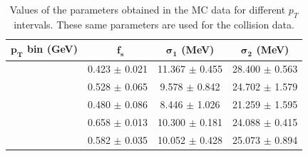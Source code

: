 \begin{table}[htp!]
	
	\begin{center}
		\begin{tabular}{|c|c|c|c|}
			\hline
			\textbf{$\mathbf{p_T}$ bin (GeV)} & \ $\mathbf{f_s}$ & \textbf{$\mathbf{\sigma_1}$ (MeV) }& \textbf{$\mathbf{\sigma_2}$ (MeV)}\\ \hline
			[7, 10] & 0.423 $\pm$ 0.021 & 11.367 $\pm$ 0.455 &28.400 $\pm$ 0.563\\ \hline 
			[10, 15] & 0.528 $\pm$ 0.065 & 9.578 $\pm$ 0.842 &24.702 $\pm$ 1.579\\ \hline 
			[15, 20] & 0.480 $\pm$ 0.086 & 8.446 $\pm$ 1.026 &21.259 $\pm$ 1.595\\ \hline 
			[20, 50] & 0.658 $\pm$ 0.013 & 10.300 $\pm$ 0.181 &24.088 $\pm$ 0.415\\ \hline 
			[7, 50] & 0.582 $\pm$ 0.035 & 10.052 $\pm$ 0.428 &25.073 $\pm$ 0.894\\ \hline 
		\end{tabular}
	\end{center}
	\caption{Values of the parameters obtained in the MC data for different $p_T$ intervals. These same parameters are used for the collision data.}
	\label{table:mc_ptbins}
\end{table}

